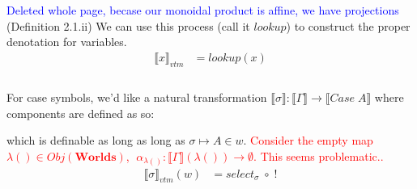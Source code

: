 \documentclass{article}
\newcommand{\den}[1]{\llbracket #1 \rrbracket}
\newcommand{\blue}[1]{\textcolor{blue}{#1}}
\newcommand{\red}[1]{\textcolor{red}{#1}}
\begin{document}
\blue{Deleted whole page, becase our monoidal product is affine, we have projections} \cite{JACOBS199473}(Definition 2.1.ii) We can use this process (call it $lookup$) to construct the proper denotation for variables.
\begin{align*}
    \llbracket  x \rrbracket_{vtm} &= lookup(x) \\
\end{align*}
\\
For case symbols, we'd like a natural transformation $\den{\sigma} : \den{\Gamma} \rightarrow \den{Case \;A}$ where components are defined as so:\\

\begin{figure}[!h]
    \centering
\end{figure}
which is definable as long as long as $\sigma \mapsto A \in w$. \red{Consider the empty map $\lambda() \in Obj(\mathbf{Worlds})$,  $\;\alpha_{\lambda()} : \den{\Gamma}(\lambda()) \rightarrow \emptyset$. This seems problematic..}
\begin{align*}
    \llbracket  \sigma \rrbracket_{vtm}(w) &= select_{\sigma} \;\circ\; !\\
\end{align*}
\end{document}

